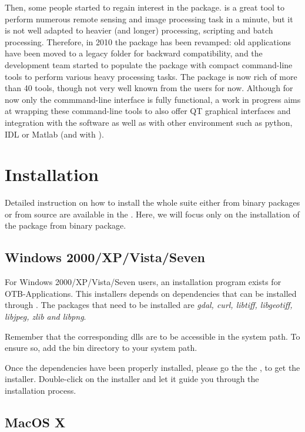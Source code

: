 Then, some people started to regain interest in the \app package. \mont
is a great tool to perform numerous remote sensing and image
processing task in a minute, but it is not well adapted to heavier
(and longer) processing, scripting and batch processing. Therefore, in
2010 the \app package has been revamped: old applications have been
moved to a legacy folder for backward compatibility, and the
development team started to populate the package with compact
command-line tools to perform various heavy processing tasks. The
package is now rich of more than 40 tools, though not very well known
from the users for now. Although for now only the commmand-line
interface is fully functional, a work in progress aims at wrapping these
command-line tools to also offer QT graphical interfaces and integration
with the \qgis software as well as with other environment such as python,
IDL or Matlab (and with \mont).

\section{Installation}\label{sec:appinstall}

Detailed instruction on how to install the whole \otb suite either
from binary packages or from source are available in the \sg. Here, we
will focus only on the installation of the \app package from binary
package.

\subsection{Windows 2000/XP/Vista/Seven}
\label{ssec:app_windows_binaries}

For Windows 2000/XP/Vista/Seven users, an installation program exists
for OTB-Applications. This installers depends on dependencies that can
be installed through \osgeow. The packages that need to be installed
are \emph{gdal, curl, libtiff, libgeotiff, libjpeg, zlib and libpng}.

Remember that the corresponding dlls are to be accessible in the
system path. To ensure so, add the \osgeow bin directory to your
system path.

 Once the dependencies have been properly installed, please go the the
 \download, to get the installer. Double-click on the installer and
 let it guide you through the installation process.

\subsection{MacOS X}
\label{ssec:mac_binaries}

